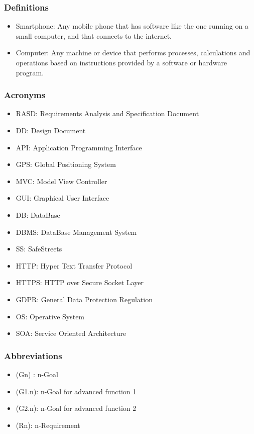 \subsubsection{Definitions}
\begin{itemize}
	\item Smartphone: Any mobile phone that has software like the one running on a small computer, and that connects to the internet.
	\item Computer: Any machine or device that performs processes, calculations and operations based on instructions provided by a software or hardware program.
\end{itemize}
\subsubsection{Acronyms}
\begin{itemize}
	\item RASD: Requirements Analysis and Specification Document
	\item DD: Design Document
	\item API: Application Programming Interface
	\item GPS: Global Positioning System
	\item MVC: Model View Controller
	\item GUI: Graphical User Interface
	\item DB: DataBase
	\item DBMS: DataBase Management System
	\item SS: SafeStreets
	\item HTTP: Hyper Text Transfer Protocol
	\item HTTPS: HTTP over Secure Socket Layer
	\item GDPR: General Data Protection Regulation
	\item OS: Operative System
	\item SOA: Service Oriented Architecture
\end{itemize}
\subsubsection{Abbreviations}
\begin{itemize}
	\item (Gn) : n-Goal
	\item (G1.n): n-Goal for advanced function 1
	\item (G2.n): n-Goal for advanced function 2
	\item (Rn): n-Requirement
\end{itemize}
